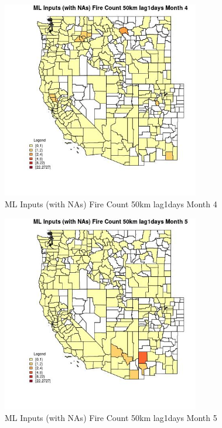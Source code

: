 \begin{figure} 
\centering  
\includegraphics[width=0.77\textwidth]{Code_Outputs/Report_ML_input_PM25_Step4_part_f_de_duplicated_aves_prioritize_24hr_obswNAs_CountyFire_Count_50km_lag1daysmedianMonth4.jpg} 
\caption{\label{fig:Report_ML_input_PM25_Step4_part_f_de_duplicated_aves_prioritize_24hr_obswNAsCountyFire_Count_50km_lag1daysmedianMonth4}ML Inputs (with NAs) Fire Count 50km lag1days Month 4} 
\end{figure} 
 

\begin{figure} 
\centering  
\includegraphics[width=0.77\textwidth]{Code_Outputs/Report_ML_input_PM25_Step4_part_f_de_duplicated_aves_prioritize_24hr_obswNAs_CountyFire_Count_50km_lag1daysmedianMonth5.jpg} 
\caption{\label{fig:Report_ML_input_PM25_Step4_part_f_de_duplicated_aves_prioritize_24hr_obswNAsCountyFire_Count_50km_lag1daysmedianMonth5}ML Inputs (with NAs) Fire Count 50km lag1days Month 5} 
\end{figure} 
 

